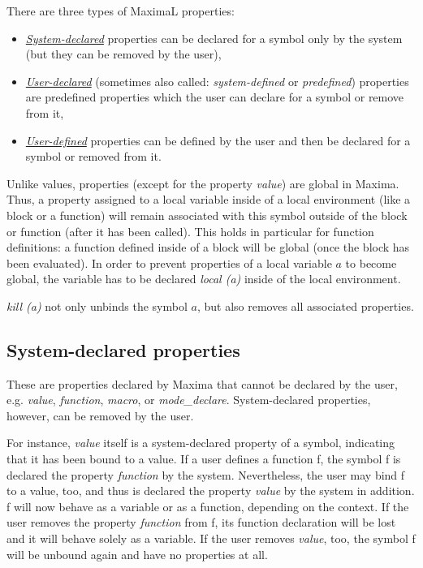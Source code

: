 \documentclass[../Maxima_Workbook.tex]{subfiles}
\begin{document}
\lz There are three types of MaximaL properties:

\begin{itemize}
	\item \hyperref[Db1]{\emph{System-declared}} properties can be declared for a symbol only by the system (but they can be removed by the user),
	\item  \hyperref[Db3]{\emph{User-declared}} (sometimes also called: \emph{system-defined} or \emph{predefined}) properties are predefined properties which the user can declare for a symbol or remove from it,
	\item \hyperref[Db4]{\emph{User-defined}}
	properties can be defined by the user and then be declared for a symbol or removed from it.
\end{itemize}

\lz Unlike values, properties (except for the property \emph{value}) are global in Maxima. Thus, a property assigned to a local variable inside of a local environment (like a block or a function) will remain associated with this symbol outside of the block or function (after it has been called). This holds in particular for function definitions: a function defined inside of a block will be global (once the block has been evaluated). In order to prevent properties of a local variable $a$ to become global, the variable has to be declared \emph{local (a)} inside of the local environment.

\lz \emph{kill (a)} not only unbinds the symbol $a$, but also removes all associated properties.

\subsection{System-declared properties}\label{Db1}

These are properties declared by Maxima that cannot be declared by the user, e.g. \emph{value}, \emph{function}, \emph{macro}, or \emph{mode\_declare}. System-declared properties, however, can be removed by the user.

\lz For instance, \emph{value} itself is a system-declared property of a symbol, indicating that it has been bound to a value. If a user defines a function f, the symbol f is declared the property \emph{function} by the system. Nevertheless, the user may bind f to a value, too, and thus is declared the property \emph{value} by the system in addition. f will now behave as a variable or as a function, depending on the context. If the user removes the property \emph{function} from f, its function declaration will be lost and it will behave solely as a variable. If the user removes \emph{value}, too, the symbol f will be unbound again and have no properties at all.
\end{document}
